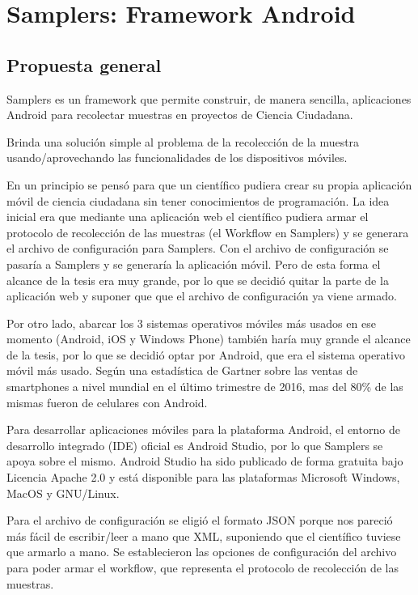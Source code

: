 \chapter{Samplers: Framework Android}

\section{Propuesta general}
Samplers es un framework que permite construir, de manera sencilla, aplicaciones Android para recolectar muestras en proyectos de Ciencia Ciudadana.

Brinda una solución simple al problema de la recolección de la muestra usando/aprovechando las funcionalidades de los dispositivos móviles.

En un principio se pensó para que un científico pudiera crear su propia aplicación móvil de ciencia ciudadana sin tener conocimientos de programación. La idea inicial era que mediante una aplicación web el científico pudiera armar el protocolo de recolección de las muestras (el Workflow en Samplers) y se generara el archivo de configuración para Samplers. Con el archivo de configuración se pasaría a Samplers y se generaría la aplicación móvil. Pero de esta forma el alcance de la tesis era muy grande, por lo que se decidió quitar la parte de la aplicación web y suponer que que el archivo de configuración ya viene armado.

Por otro lado, abarcar los 3 sistemas operativos móviles más usados en ese momento (Android, iOS y Windows Phone) también haría muy grande el alcance de la tesis, por lo que se decidió optar por Android, que era el sistema operativo móvil más usado. Según una estadística de Gartner sobre las ventas de smartphones a nivel mundial en el último trimestre de 2016\cite{gartner}, mas del 80\% de las mismas fueron de celulares con Android.

Para desarrollar aplicaciones móviles para la plataforma Android, el entorno de desarrollo integrado (IDE) oficial es Android Studio\cite{androidStudio}, por lo que Samplers se apoya sobre el mismo. Android Studio ha sido publicado de forma gratuita bajo Licencia Apache 2.0 y está disponible para las plataformas Microsoft Windows, MacOS y GNU/Linux.

Para el archivo de configuración se eligió el formato JSON porque nos pareció más fácil de escribir/leer a mano que XML, suponiendo que el científico tuviese que armarlo a mano. Se establecieron las opciones de configuración del archivo para poder armar el workflow, que representa el protocolo de recolección de las muestras.


